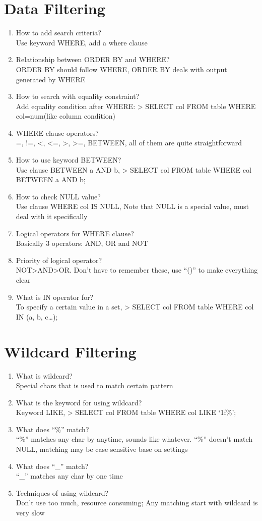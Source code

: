 \documentclass[10pt,a4paper,oneside]{article}
\begin{document}
\section{Data Filtering}
\begin{enumerate}[1.]
\item How to add search criteria?   \\
Use keyword WHERE, add a where clause
\item  Relationship between ORDER BY and WHERE?  \\
ORDER BY should follow WHERE, ORDER BY deals with output generated by WHERE
\item  How to search with equality constraint?  \\
Add equality condition after WHERE: > SELECT col FROM table WHERE col=num(like column condition)
\item  WHERE clause operators?  \\
=, !=,  <, <=, >, >=, BETWEEN, all of them are quite straightforward
\item  How to use keyword BETWEEN?  \\
Use clause BETWEEN a AND b, > SELECT col FROM table WHERE col BETWEEN a AND b;
\item How to check NULL value?   \\
Use clause WHERE col IS NULL, Note that NULL is a special value, must deal with it specifically
\item Logical operators for WHERE clause?   \\
Basically 3 operators: AND, OR and NOT
\item  Priority of logical operator?  \\
NOT>AND>OR. Don’t have to remember these, use ``()'' to make everything clear
\item  What is IN operator for?  \\
To specify a certain value in a set, > SELECT col FROM table WHERE col IN (a, b, c…);
\end{enumerate}
\section{Wildcard Filtering}
\begin{enumerate}[1.]
\item  What is wildcard?  \\
Special chars that is used to match certain pattern
\item   What is the keyword for using wildcard? \\
Keyword LIKE, > SELECT col FROM table WHERE col LIKE `1f\%';
\item What does ``\%'' match?   \\
``\%'' matches any char by anytime, sounds like whatever. ``\%'' doesn’t match NULL, matching may be case sensitive base on settings
\item  What does ``\_'' match?  \\
``\_'' matches any char by one time
\item   Techniques of using wildcard? \\
Don't use too much, resource consuming; Any matching start with wildcard is very slow 
\end{enumerate}
\end{document}
